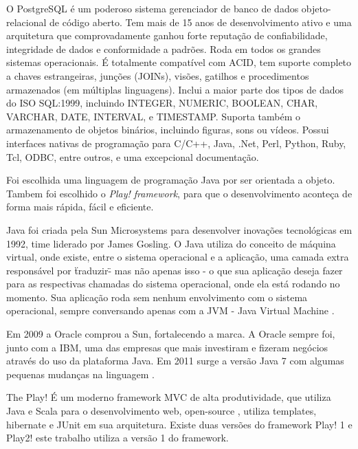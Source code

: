 O PostgreSQL é um poderoso sistema gerenciador de banco de dados objeto-relacional de código aberto.  Tem mais de 15 anos de desenvolvimento ativo e uma arquitetura que comprovadamente ganhou forte reputação de confiabilidade, integridade de dados e conformidade a padrões.  Roda em todos os grandes sistemas operacionais. É totalmente compatível com ACID, tem suporte completo a chaves estrangeiras, junções (JOINs), visões, gatilhos e procedimentos armazenados (em múltiplas linguagens).  Inclui a maior parte dos tipos de dados do ISO SQL:1999, incluindo INTEGER, NUMERIC, BOOLEAN, CHAR, VARCHAR, DATE, INTERVAL, e TIMESTAMP.  Suporta também o armazenamento de objetos binários, incluindo figuras, sons ou vídeos.  Possui interfaces nativas de programação para C/C++, Java, .Net, Perl, Python, Ruby, Tcl, ODBC, entre outros, e uma excepcional documentação.\cite{postgresql}


Foi escolhida uma linguagem de programação Java por ser orientada a objeto. Tambem foi escolhido o \textit{Play! framework}, para que o desenvolvimento aconteça de forma mais rápida, fácil e eficiente.\par

Java foi criada pela Sun Microsystems para desenvolver inovações tecnológicas em 1992, time liderado por James Gosling. O Java utiliza do conceito de máquina virtual, onde existe, entre o sistema operacional e a aplicação, uma camada extra responsável por \"traduzir\" - mas não apenas isso - o que sua aplicação deseja fazer para as respectivas chamadas do sistema operacional, onde ela está rodando no momento. Sua aplicação roda sem nenhum envolvimento com o sistema operacional, sempre conversando apenas com a JVM - Java Virtual Machine \cite{caelum}.\par

Em 2009 a Oracle comprou a Sun, fortalecendo a marca. A Oracle sempre foi, junto com a IBM, uma das empresas que mais investiram e fizeram negócios através do uso da plataforma Java. Em 2011 surge a versão Java 7 com algumas pequenas mudanças na linguagem \cite{caelum}.\par


The Play! É um moderno framework MVC de alta produtividade, que utiliza Java e Scala para o desenvolvimento web, open-source , utiliza templates, hibernate e JUnit  em sua arquitetura. Existe duas versões do framework Play! 1 e Play2! este trabalho utiliza a versão 1 do framework\cite{playframework}.\par



